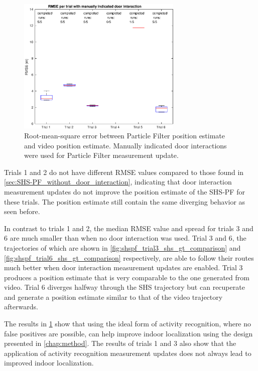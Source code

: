 \begin{figure}[H]
	\centering
	\includegraphics[width=0.7\textwidth]{images/20201201_1850_RMSE_per_trial_with_manually_indicated_door_interaction}
	\caption[Particle Filter position estimation performance with manual door interaction]{ Root-mean-square error between Particle Filter position estimate and video position estimate. Manually indicated door interactions were used for Particle Filter measurement update.}	
	\label{fig:pf_boxplot}
\end{figure}

Trials 1 and 2 do not have different RMSE values compared to those found in \cref{sec:SHS-PF_without_door_interaction}, indicating that door interaction measurement updates do not improve the position estimate of the SHS-PF for these trials. The position estimate still contain the same diverging behavior as seen before.\par 

In contrast to trials 1 and 2, the median RMSE value and spread for trials 3 and 6 are much smaller than when no door interaction was used.
Trial 3 and 6, the trajectories of which are shown in \cref{fig:shspf_trial3_shs_gt_comparison} and \cref{fig:shspf_trial6_shs_gt_comparison} respectively, are able to follow their routes much better when door interaction measurement updates are enabled. Trial 3 produces a position estimate that is very comparable to the one generated from video. Trial 6 diverges halfway through the SHS trajectory but can recuperate and generate a position estimate similar to that of the video trajectory afterwards.\par 

The results in \cref{fig:pf_boxplot} show that using the ideal form of activity recognition, where no false positives are possible, can help improve indoor localization using the design presented in \cref{chap:method}. The results of trials 1 and 3 also show that the application of activity recognition measurement updates does not always lead to improved indoor localization.

